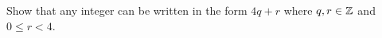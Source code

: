 \guard



\begin{exercise}
\label{exercise:integersMod4}
  Show that any integer can be written in the form $4q+r$ where $q,r\in\mathbb{Z}$ and $0\leq r<4$. 
\end{exercise}
